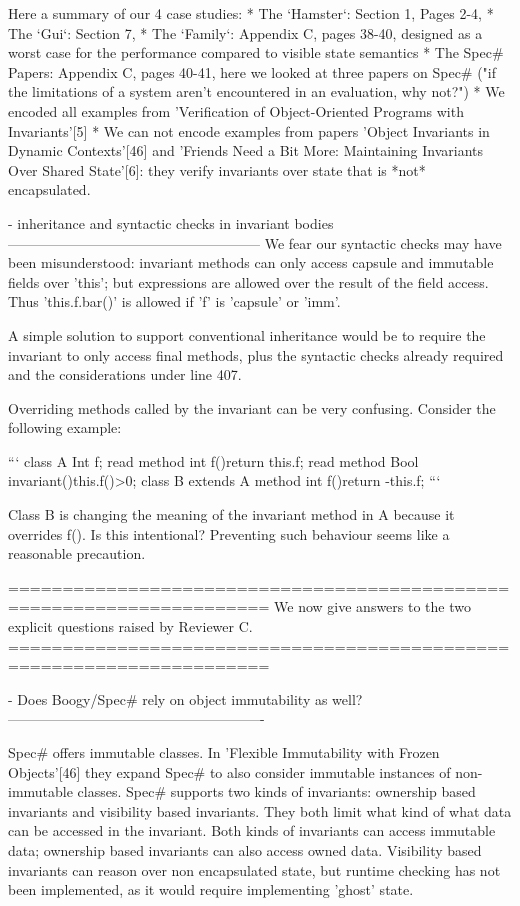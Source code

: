 Here a summary of our 4 case studies:
* The `Hamster`: Section 1, Pages 2-4, 
* The `Gui`: Section 7,
* The `Family`: Appendix C, pages 38-40,
  designed as a worst case for the performance compared to visible state semantics
* The Spec# Papers: Appendix C, pages 40-41,
  here we looked at three papers on Spec# ("if the limitations of a system aren't encountered in an evaluation, why not?")
 *  We encoded all examples from 'Verification of Object-Oriented Programs with Invariants'[5]
 *  We can not encode examples from papers 'Object Invariants in Dynamic Contexts'[46] and
   'Friends Need a Bit More: Maintaining Invariants Over Shared State'[6]:
   they verify invariants over state that is *not* encapsulated.


- inheritance and syntactic checks in invariant bodies
------------------------------------------------------
We fear our syntactic checks may have been misunderstood:
invariant methods can only access capsule and immutable fields over 'this';
but expressions are allowed over the result of the field access.
Thus 'this.f.bar()' is allowed if 'f' is 'capsule' or 'imm'. 

A simple solution to support conventional inheritance would be to require the invariant to only
access final methods, plus the syntactic checks already required and the considerations under line 407.

Overriding methods called by the invariant can be very confusing.
Consider the following example:

```
class A{
  Int f;
  read method int f(){return this.f;}
  read method Bool invariant(){this.f()>0;}
}
class B extends A {
  method int f(){return -this.f;}
}
```

Class B is changing the meaning of the invariant method in A because it overrides f().
Is this intentional? Preventing such behaviour seems like a reasonable precaution.


======================================================================
We now give answers to the two explicit questions raised by Reviewer C.
======================================================================


- Does Boogy/Spec# rely on object immutability as well?
-------------------------------------------------------

Spec# offers immutable classes. In 'Flexible Immutability with Frozen Objects'[46] they expand Spec# to also consider immutable instances of non-immutable classes. Spec# supports two kinds of invariants: ownership based invariants and visibility based invariants.
They both limit what kind of what data can be accessed in the invariant. Both kinds of invariants can access immutable data; ownership based invariants can also access owned data. Visibility based invariants can reason over non encapsulated state, but runtime checking has not been implemented, as it would require implementing 'ghost' state. 


